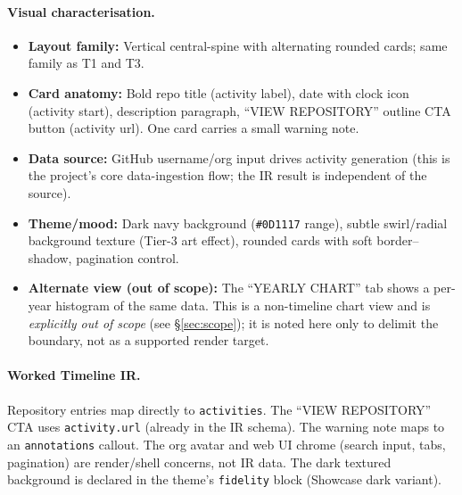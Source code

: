 \paragraph{Visual characterisation.}
\begin{itemize}
  \item \textbf{Layout family:} Vertical central-spine with alternating rounded cards;
        same family as T1 and T3.
  \item \textbf{Card anatomy:} Bold repo title (activity label), date with clock icon
        (activity start), description paragraph, ``VIEW REPOSITORY'' outline CTA button
        (activity url). One card carries a small warning note.
  \item \textbf{Data source:} GitHub username/org input drives activity generation
        (this is the project's core data-ingestion flow; the IR result is independent
        of the source).
  \item \textbf{Theme/mood:} Dark navy background (\texttt{\#0D1117} range), subtle
        swirl/radial background texture (Tier-3 art effect), rounded cards with soft
        border--shadow, pagination control.
  \item \textbf{Alternate view (out of scope):} The ``YEARLY CHART'' tab shows a
        per-year histogram of the same data. This is a non-timeline chart view and is
        \emph{explicitly out of scope} (see \S\ref{sec:scope}); it is noted here only
        to delimit the boundary, not as a supported render target.
\end{itemize}

\paragraph{Worked Timeline IR.}
Repository entries map directly to \texttt{activities}. The ``VIEW REPOSITORY'' CTA uses
\texttt{activity.url} (already in the IR schema). The warning note maps to an
\texttt{annotations} callout. The org avatar and web UI chrome (search input, tabs,
pagination) are render/shell concerns, not IR data. The dark textured background is
declared in the theme's \texttt{fidelity} block (Showcase dark variant).


